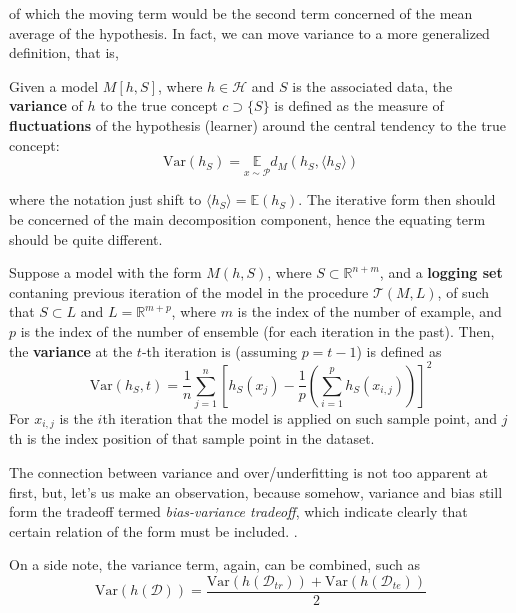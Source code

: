 of which the moving term would be the second term concerned of the mean average of the hypothesis. In fact, we can move variance to a more generalized definition, that is, 

\begin{definition}[Variance, II]
  Given a model $M[h,S]$, where $h\in\mathcal{H}$ and $S$ is the associated data, the \textbf{variance} of $h$ to the true concept $c\supset \{S\}$ is defined as the measure of \textbf{fluctuations} of the hypothesis (learner) around the central tendency to the true concept: 
  \begin{equation}
    \mathrm{Var}(h_S) = \underset{x\sim \mathcal{P}}{\mathbb{E}} d_{M} (h_S, \langle h_S \rangle) 
  \end{equation}
\end{definition}

where the notation just shift to $\langle h_S \rangle = \mathbb{E}(h_S)$. The iterative form then should be concerned of the main decomposition component, hence the equating term should be quite different. 

\begin{definition}
  Suppose a model with the form $M(h,S)$, where $S\subset \mathbb{R}^{n+m}$, and a \textbf{logging set} contaning previous iteration of the model in the procedure $\mathcal{T}(M,L)$, of such that $S\subset L$ and $L = \mathbb{R}^{m + p}$, where $m$ is the index of the number of example, and $p$ is the index of the number of ensemble (for each iteration in the past). Then, the \textbf{variance} at the $t$-th iteration is (assuming $p=t-1$) is defined as
  \begin{equation}
    \mathrm{Var}(h_S, t) = \frac{1}{n}\sum_{j=1}^{n} \left[ h_{S}(x_j) - \frac{1}{p}\left(\sum_{i=1}^{p} h_S(x_{i,j})\right)  \right]^2
  \end{equation}
  For $x_{i,j}$ is the $i$th iteration that the model is applied on such sample point, and $j$th is the index position of that sample point in the dataset. 
\end{definition}

The connection between variance and over/underfitting is not too apparent at first, but, let's us make an observation, because somehow, variance and bias still form the tradeoff termed \textit{bias-variance tradeoff}, which indicate clearly that certain relation of the form must be included. . 

On a side note, the variance term, again, can be combined, such as
\begin{equation}
  \mathrm{Var}(h(\mathcal{D})) = \frac{\mathrm{Var}(h(\mathcal{D}_{tr}))+ \mathrm{Var}(h(\mathcal{D}_{te}))}{2}
\end{equation}


